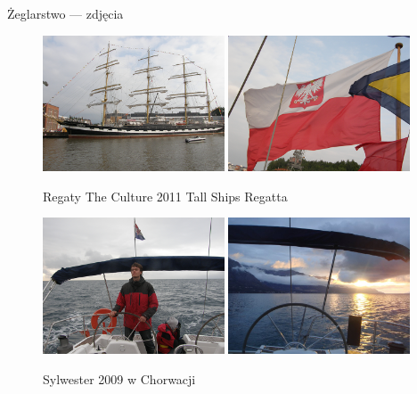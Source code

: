 \begin{frame}[allowframebreaks]{Żeglarstwo --- zdjęcia}
	\begin{figure}[!htp]
		\includegraphics[width=0.48\textwidth]{img/kruzernstern}
		\hspace{0.02\textwidth}
		\includegraphics[width=0.48\textwidth]{img/flaga}
		\caption{Regaty The Culture 2011 Tall Ships Regatta}
	\end{figure}
	
	\begin{figure}[!htp]
		\includegraphics[width=0.48\textwidth]{img/chorwa}
		\hspace{0.02\textwidth}
		\includegraphics[width=0.48\textwidth]{img/chorwa2}
		\caption{Sylwester 2009 w Chorwacji}
	\end{figure}
	

\end{frame}
